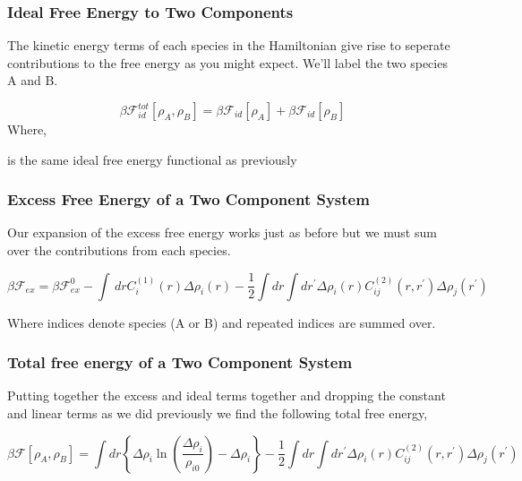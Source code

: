 \documentclass[11pt]{article}
\newcommand{\F}{\mathcal{F}}
\renewcommand{\l}{\left}
\renewcommand{\r}{\right}
\newcommand{\f}{\frac}
\begin{document}
\subsubsection{Ideal Free Energy to Two Components}
The kinetic energy terms of each species in the Hamiltonian give rise to seperate contributions to the free energy as you might expect.
We'll label the two species A and B.

\begin{equation}
    \beta\F^{tot}_{id}[\rho_A, \rho_B] = \beta\F_{id}[\rho_A] + \beta\F_{id}[\rho_B]
\end{equation}
Where,
\begin{description}[labelindent=10pt, labelsep=10pt]
    \item[$\beta\F_{id}$] is the same ideal free energy functional as previously
\end{description}

\subsubsection{Excess Free Energy of a Two Component System}
Our expansion of the excess free energy works just as before but we must sum over the contributions from each species.

\begin{equation}
    \beta\F_{ex} = \beta\F_{ex}^0 - \int \,dr C^{(1)}_{i}(r) \Delta\rho_i(r)
    - \f{1}{2} \int dr \int dr^\prime \Delta\rho_i(r) C^{(2)}_{ij}(r, r^\prime) \Delta\rho_j(r^\prime)
\end{equation}

Where indices denote species (A or B) and repeated indices are summed over.

\subsubsection{Total free energy of a Two Component System}

Putting together the excess and ideal terms together and dropping the constant and linear terms as we did previously we find the following total free energy,

\begin{equation}
    \beta\F[\rho_A, \rho_B] = \int dr \l\lbrace \Delta\rho_i \ln\l(\f{\Delta\rho_i}{\rho_{i0}}\r) - \Delta\rho_i\r\rbrace
        - \f{1}{2} \int dr \int dr^\prime \Delta\rho_i(r) C^{(2)}_{ij}(r, r^\prime) \Delta \rho_j(r^\prime)
\end{equation}
\end{document}
